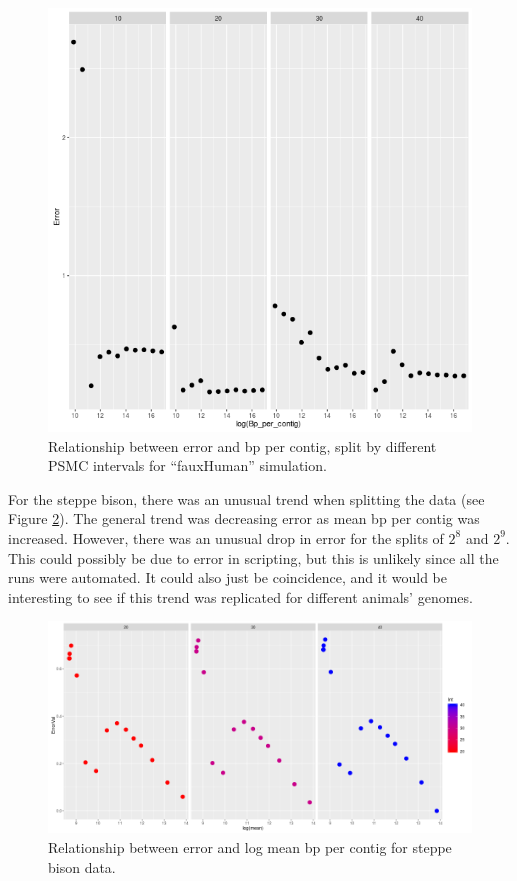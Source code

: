 \documentclass[11pt,a4paper]{article}
\begin{document}
\begin{figure}[h]
  \center
  \includegraphics[width=.7\linewidth]{figures/fauxHumanErrorVsBpWithIntGrid.png}
  \caption{Relationship between error and bp per contig, split by different PSMC intervals for ``fauxHuman'' simulation.}\label{fauxHumanErrorVsBpWithIntGrid}
\end{figure}

For the steppe bison, there was an unusual trend when splitting the data (see Figure \ref{steppeBisonWeirdTrend}). The general trend was decreasing error as mean bp per contig was increased. However, there was an unusual drop in error for the splits of $2^8$ and $2^9$. This could possibly be due to error in scripting, but this is unlikely since all the runs were automated. It could also just be coincidence, and it would be interesting to see if this trend was replicated for different animals' genomes.

\begin{figure}[h]
  \center
  \includegraphics[width=.7\linewidth]{figures/steppeBisonWeirdTrend.png}
  \caption{Relationship between error and log mean bp per contig for steppe bison data.}\label{steppeBisonWeirdTrend}
\end{figure}
\end{document}
